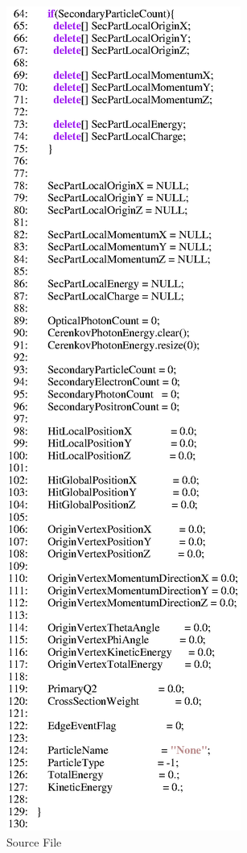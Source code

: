 \begin{figure}[ht]
  \hspace{0cm}
  \includegraphics[scale=0.8]{./figures5/QweakSimUserCerenkov_DetectorEvent.cc-p2.eps}
  \caption{\label{SourceV37} Source File}
           \label{fig:V-SC-40}
\end{figure}


